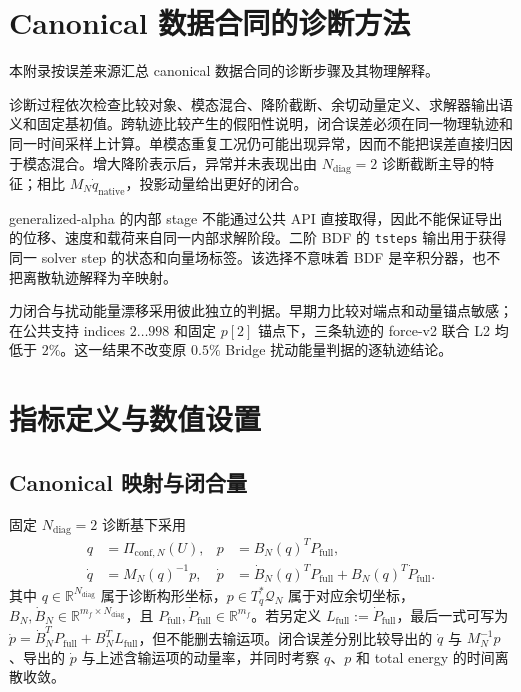 \appendix

\section{Canonical 数据合同的诊断方法}\label{app:canonical-diagnostic-chain}

本附录按误差来源汇总 canonical 数据合同的诊断步骤及其物理解释。



诊断过程依次检查比较对象、模态混合、降阶截断、余切动量定义、求解器输出语义和固定基初值。跨轨迹比较产生的假阳性说明，闭合误差必须在同一物理轨迹和同一时间采样上计算。单模态重复工况仍可能出现异常，因而不能把误差直接归因于模态混合。增大降阶表示后，异常并未表现出由 \(N_{\mathrm{diag}}=2\) 诊断截断主导的特征；相比 \(M_N\dot q_{\mathrm{native}}\)，投影动量给出更好的闭合。

generalized-alpha 的内部 stage 不能通过公共 API 直接取得，因此不能保证导出的位移、速度和载荷来自同一内部求解阶段。二阶 BDF 的 \texttt{tsteps} 输出用于获得同一 solver step 的状态和向量场标签。该选择不意味着 BDF 是辛积分器，也不把离散轨迹解释为辛映射。

力闭合与扰动能量漂移采用彼此独立的判据。早期力比较对端点和动量锚点敏感；在公共支持 indices \(2\ldots998\) 和固定 \(p[2]\) 锚点下，三条轨迹的 force-v2 联合 L2 均低于 \(2\%\)。这一结果不改变原 \(0.5\%\) Bridge 扰动能量判据的逐轨迹结论。

\section{指标定义与数值设置}\label{app:numerical-settings}

\subsection{Canonical 映射与闭合量}

固定 \(N_{\mathrm{diag}}=2\) 诊断基下采用
\begin{align}
q &= \Pi_{\mathrm{conf},N}(U), &
p &= B_N(q)^{T}P_{\mathrm{full}}, \\
\dot q &= M_N(q)^{-1}p, &
\dot p &= \dot B_N(q)^{T}P_{\mathrm{full}}+B_N(q)^{T}\dot P_{\mathrm{full}} .
\end{align}
其中 \(q\in\mathbb{R}^{N_{\mathrm{diag}}}\) 属于诊断构形坐标，\(p\in T_q^*\mathcal{Q}_{N}\) 属于对应余切坐标，\(B_N,\dot B_N\in\mathbb{R}^{m_f\times N_{\mathrm{diag}}}\)，且 \(P_{\mathrm{full}},\dot P_{\mathrm{full}}\in\mathbb{R}^{m_f}\)。若另定义 \(L_{\mathrm{full}}:=\dot P_{\mathrm{full}}\)，最后一式可写为 \(\dot p=\dot B_N^{T}P_{\mathrm{full}}+B_N^{T}L_{\mathrm{full}}\)，但不能删去输运项。闭合误差分别比较导出的 \(\dot q\) 与 \(M_N^{-1}p\)、导出的 \(\dot p\) 与上述含输运项的动量率，并同时考察 \(q\)、\(p\) 和 total energy 的时间离散收敛。

